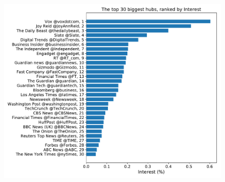 \documentclass[11pt, twoside]{report}
\begin{document}
    \begin{figure}[htbp]
      \centering
      \includegraphics[width=\textwidth]{../../scripts/network_analysis/imgs/hubs_interest.pdf}
      \caption{}
    \end{figure}

\newpage
\end{document}
